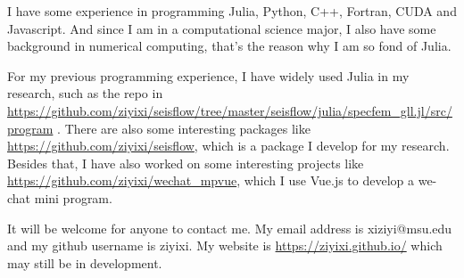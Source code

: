 \documentclass[12pt]{extarticle}
\begin{document}
I have some experience in programming Julia, Python, C++, Fortran, CUDA and Javascript. And since I am in a computational science major, I also have some 
background in numerical computing, that's the reason why I am so fond of Julia.

For my previous programming experience, I have widely used Julia in my research, such as the repo in \url{https://github.com/ziyixi/seisflow/tree/master/seisflow/julia/specfem_gll.jl/src/program} .
There are also some interesting packages like \url{https://github.com/ziyixi/seisflow}, which is a package I develop for my research. Besides that, I have also worked on some
interesting projects like \url{https://github.com/ziyixi/wechat_mpvue}, which I use Vue.js to develop a we-chat mini program.

It will be welcome for anyone to contact me. My email address is xiziyi@msu.edu and my github username is ziyixi. My website is \url{https://ziyixi.github.io/} which may
still be in development. 
\end{document}
